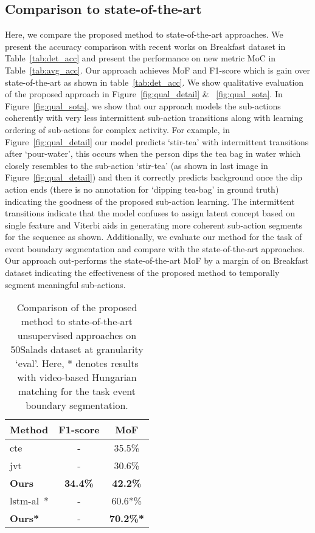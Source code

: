 \documentclass[final]{cvpr}
\begin{document}
\subsection{Comparison to state-of-the-art}
\par Here, we compare the proposed method to state-of-the-art approaches.
We present the accuracy comparison with recent works on Breakfast dataset in Table~\ref{tab:det_acc} and present the performance on new metric MoC in Table~\ref{tab:avg_acc}. 
Our approach achieves  MoF and  F1-score which is  gain over state-of-the-art as shown in table~\ref{tab:det_acc}.
We show qualitative evaluation of the proposed approach in Figure~\ref{fig:qual_detail} \& ~\ref{fig:qual_sota}. In Figure~\ref{fig:qual_sota}, we show that our approach models the sub-actions coherently with very less intermittent sub-action transitions along with learning ordering of sub-actions for complex activity. For example, in Figure~\ref{fig:qual_detail} our model predicts `stir-tea' with intermittent transitions after `pour-water', this occurs when the person dips the tea bag in water which closely resembles to the sub-action `stir-tea' (as shown in last image in Figure~\ref{fig:qual_detail}) and then it correctly predicts background once the dip action ends (there is no annotation for `dipping tea-bag' in ground truth) indicating the goodness of the proposed sub-action learning. The intermittent transitions indicate that the model confuses to assign latent concept based on single feature and Viterbi aids in generating more coherent sub-action segments for the sequence as shown. Additionally, we evaluate our method for the task of event boundary segmentation and compare with the state-of-the-art approaches. Our approach out-performs the state-of-the-art MoF by a margin of  on Breakfast dataset indicating the effectiveness of the proposed method to temporally segment meaningful sub-actions.



\begin{table}[t]
  \caption{ {\small Comparison of the proposed method to state-of-the-art unsupervised approaches on 50Salads dataset at granularity `eval'. Here, * denotes results with video-based Hungarian matching for the task event boundary segmentation.} }
  \label{tab:sal_acc}
  \centering
    \small
  \begin{tabular}{lcc}
    \toprule
    {\bf Method} & {\bf F1-score} & {\bf MoF}\\
    \midrule
    {\sc cte}~\cite{kukleva2019unsupervised}  & - & 35.5\%      \\
    {\sc jvt}~\cite{vidalmata2020joint} & - & 30.6\% \\
    \midrule
    {\bf Ours}  & \textbf{34.4\%} &  \textbf{42.2\%}  \\
    \midrule
    \midrule
    {\sc lstm-al}~\cite{aakur2019perceptual}* & - & 60.6*\% \\
    {\bf Ours*}  & - & \textbf{70.2\%*} \\
    \bottomrule
  \end{tabular}
\end{table}
\end{document}
